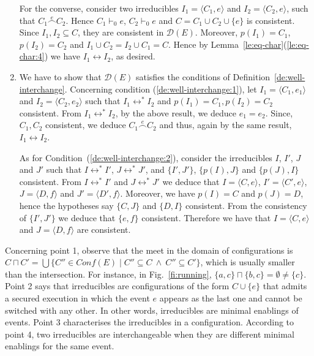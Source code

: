 \documentclass[conference]{IEEEtran}
\renewenvironment{proof}{\begin{IEEEproof}}{\end{IEEEproof}}
\newcommand{\pred}[1]{\ensuremath{\mathit{p}({#1})}}
\newcommand{\esir}[2]{\ensuremath{\langle{#1}, {#2}\rangle}}
\newcommand{\conf}[1]{\ensuremath{\mathit{Conf}({#1})}}
\newcommand{\conn}[1]{\ensuremath{\stackrel{#1}{\frown}}}
\newcommand{\zdom}[0]{\ensuremath{\mathcal{D}}}
\newcommand{\dom}[1]{\ensuremath{\zdom({#1})}}
\begin{document}
\begin{proof}
\begin{enumerate}
  For the converse, consider two irreducibles $I_1 = \esir{C_1}{e}$
  and $I_2 = \esir{C_2}{e}$, such that $C_1 \conn{e} C_2$. Hence
  $C_1 \vdash_0 e$, $C_2 \vdash_0 e$ and
  $C = C_1 \cup C_2 \cup \{ e \}$ is consistent. Since
  $I_1, I_2 \subseteq C$, they are consistent in
  $\dom{{E}}$. Moreover, $\pred{I_1} = C_1$, $\pred{I_2} = C_2$
  and $I_1 \cup C_2 = I_2 \cup C_1 = C$.
  Hence by
  Lemma~\ref{le:eq-char}(\ref{le:eq-char:4}) we have
  $I_1 \leftrightarrow I_2$, as desired.

  
\item 
  We have to show that $\dom{E}$ satisfies the conditions of Definition~\ref{de:well-interchange}. Concerning condition (\ref{de:well-interchange:1}), let
  $I_1 = \esir{C_1}{e_1}$ and $I_2 = \esir{C_2}{e_2}$ such that
  $I_1 \leftrightarrow^* I_2$ and $\pred{I_1}=C_1, \pred{I_2}=C_2$ consistent. From
  $I_1 \leftrightarrow^* I_2$, by the above result, we deduce $e_1 = e_2$.
  Since, $C_1, C_2$ consistent, we deduce $C_1 \conn{e} C_2$ and thus,
  again by the same result, $I_1 \leftrightarrow I_2$.

  As for Condition~(\ref{de:well-interchange:2}), consider the
  irreducibles $I$, $I'$, $J$ and $J'$ such that
  $I \leftrightarrow^* I'$, $J \leftrightarrow^* J'$, and
  $\{I', J'\}$, $\{\pred{I}, J\}$ and $\{\pred{J}, I\}$
  consistent. From $I \leftrightarrow^* I'$ and
  $J \leftrightarrow^* J'$ we deduce that $I = \esir{C}{e}$,
  $I' = \esir{C'}{e}$, $J = \esir{D}{f}$ and $J' =
  \esir{D'}{f}$. Moreover, we have $\pred{I}=C$ and $\pred{J}=D$,
  hence the hypotheses say $\{C, J\}$ and $\{D, I\}$ consistent. From
  the consistency of $\{I', J'\}$ we deduce that $\{e,f\}$
  consistent. Therefore we have that $I = \esir{C}{e}$ and
  $J = \esir{D}{f}$ are consistent.
\end{enumerate}
\end{proof}


Concerning point 1, observe that the meet in the domain of
configurations is
$C \sqcap C' = \bigcup \{ C'' \in \conf{{E}} \mid C'' \subseteq C\
\land\ C'' \subseteq C'\}$, which is usually smaller than the
intersection. For instance, in Fig.~\ref{fi:running},
$\{a,c\} \sqcap \{b, c\} = \emptyset \neq \{c\}$.
%
Point 2 says that irreducibles are configurations of the form
$C \cup \{ e \}$ that admits a secured execution in which the event
$e$ appears as the last one and cannot be switched with any other. In
other words, irreducibles are minimal enablings of events.
%
Point 3 characterises the irreducibles in a configuration.  According
to point 4, two irreducibles are interchangeable when they are
different minimal enablings for the same event.
\end{document}

